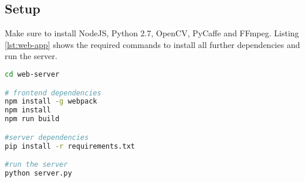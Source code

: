 \subsection{Setup}
Make sure to install NodeJS, Python 2.7, OpenCV, PyCaffe and FFmpeg.
Listing \ref{lst:web-app} shows the required commands to install all further dependencies and run the server.

\begin{lstlisting}[language=sh, caption=Web Application Setup, label=lst:web-app]
cd web-server

# frontend dependencies
npm install -g webpack
npm install
npm run build

#server dependencies
pip install -r requirements.txt

#run the server
python server.py
\end{lstlisting}